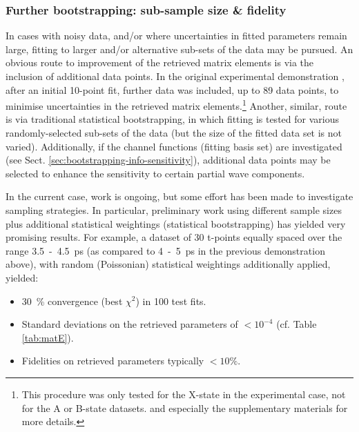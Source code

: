\documentclass[10pt]{article}
\begin{document}


\subsubsection{Further bootstrapping: sub-sample size \& fidelity}

In cases with noisy data, and/or where uncertainties in fitted parameters remain large, fitting to larger and/or alternative sub-sets of the data may be pursued.
An obvious route to improvement of the retrieved matrix elements is via the inclusion of additional data points. In the original experimental demonstration \cite{marceau2017MolecularFrameReconstruction}, after an initial 10-point fit, further data was included, up to 89 data points, to minimise uncertainties in the retrieved matrix elements.\footnote{This procedure was only tested for the X-state in the experimental case, not for the A or B-state datasets. %
and especially the supplementary materials for more details.} Another, similar, route is via traditional statistical bootstrapping, in which fitting is tested for various randomly-selected sub-sets of the data (but the size of the fitted data set is not varied). Additionally, if the channel functions (fitting basis set) are investigated (see Sect. \ref{sec:bootstrapping-info-sensitivity}), additional data points may be selected to enhance the sensitivity to certain partial wave components.

In the current case, work is ongoing, %
but some effort has been made to investigate sampling strategies. In particular, preliminary work using different sample sizes plus additional statistical weightings (statistical bootstrapping) has yielded very promising results. For example, a dataset of 30 t-points equally spaced over the range 3.5~-~4.5~ps (as compared to 4~-~5~ps in the previous demonstration above), with random (Poissonian) statistical weightings additionally applied, yielded:

\begin{itemize}
\item 30~\% convergence (best $\chi^2$) in 100 test fits.
\item Standard deviations on the retrieved parameters of $<10^{-4}$ (cf. Table \ref{tab:matE}).
\item Fidelities on retrieved parameters typically $<10\%$.
\end{itemize}
\end{document}
